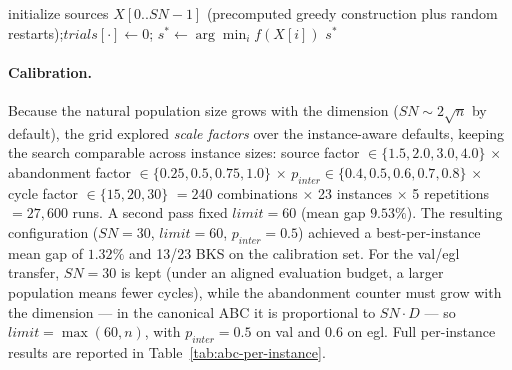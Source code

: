 \begin{algorithm}[htbp]
\DontPrintSemicolon
\caption{Artificial Bee Colony for the CARP}
\label{alg:abc-carp}


\BlankLine
initialize sources $X[0..SN{-}1]$ (precomputed greedy construction plus
random restarts);\quad $\mathit{trials}[\cdot] \leftarrow 0$;\quad
$s^{*} \leftarrow \arg\min_i f(X[i])$\;
\Return $s^{*}$\;
\end{algorithm}

\paragraph{Calibration.} Because the natural population size grows with the
dimension ($SN \sim 2\sqrt{n}$ by default), the grid explored
\emph{scale factors} over the instance-aware defaults, keeping the search
comparable across instance sizes: source factor $\in \{1.5, 2.0, 3.0,
4.0\}$ $\times$ abandonment factor $\in \{0.25, 0.5, 0.75, 1.0\}$ $\times$
$p_{inter} \in \{0.4, 0.5, 0.6, 0.7, 0.8\}$ $\times$ cycle factor $\in
\{15, 20, 30\}$ $= 240$ combinations $\times$ 23 instances $\times$ 5
repetitions $= 27{,}600$ runs. A second pass fixed
$\mathit{limit} = 60$ (mean gap $9.53\%$). The resulting configuration
($SN = 30$, $\mathit{limit} = 60$, $p_{inter} = 0.5$) achieved a
best-per-instance mean gap of $1.32\%$ and 13/23 BKS on the calibration
set. For the val/egl transfer, $SN = 30$ is kept (under an aligned
evaluation budget, a larger population means fewer cycles), while the
abandonment counter must grow with the dimension --- in the canonical ABC
it is proportional to $SN \cdot D$ --- so $\mathit{limit} = \max(60, n)$,
with $p_{inter} = 0.5$ on val and $0.6$ on egl. Full per-instance results
are reported in Table~\ref{tab:abc-per-instance}.
